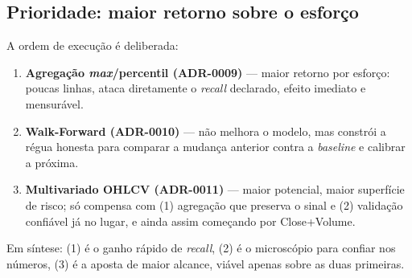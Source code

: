 \subsection{Prioridade: maior retorno sobre o esforço}
\label{sec:m8-prioridade}
A ordem de execução é deliberada:
\begin{enumerate}[noitemsep]
  \item \textbf{Agregação \emph{max}/percentil (ADR-0009)} --- maior retorno por esforço:
        poucas linhas, ataca diretamente o \emph{recall} declarado, efeito imediato e mensurável.
  \item \textbf{Walk-Forward (ADR-0010)} --- não melhora o modelo, mas constrói a régua honesta
        para comparar a mudança anterior contra a \emph{baseline} e calibrar a próxima.
  \item \textbf{Multivariado OHLCV (ADR-0011)} --- maior potencial, maior superfície de risco;
        só compensa com (1) agregação que preserva o sinal e (2) validação confiável já no lugar,
        e ainda assim começando por Close+Volume.
\end{enumerate}
Em síntese: (1) é o ganho rápido de \emph{recall}, (2) é o microscópio para confiar nos números,
(3) é a aposta de maior alcance, viável apenas sobre as duas primeiras.
